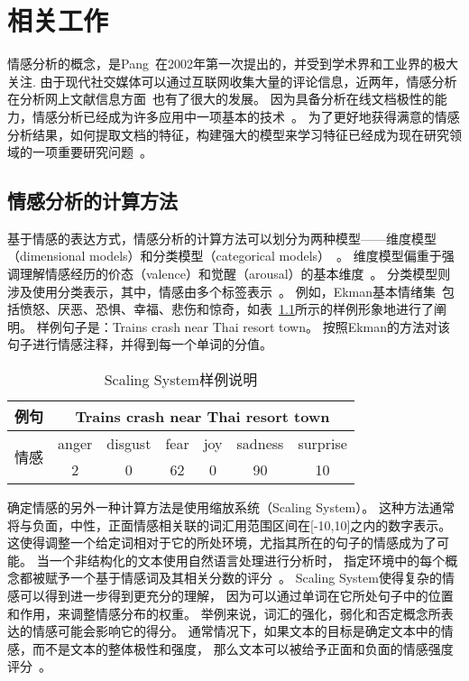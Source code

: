 
\chapter{相关工作}

情感分析的概念，是Pang~在2002年第一次提出的，并受到学术界和工业界的极大关注.
由于现代社交媒体可以通过互联网收集大量的评论信息，近两年，情感分析在分析网上文献信息方面~也有了很大的发展。
因为具备分析在线文档极性的能力，情感分析已经成为许多应用中一项基本的技术~。
为了更好地获得满意的情感分析结果，如何提取文档的特征，构建强大的模型来学习特征已经成为现在研究领域的一项重要研究问题~。

\section{情感分析的计算方法}
基于情感的表达方式，情感分析的计算方法可以划分为两种模型——维度模型（dimensional models）和分类模型（categorical models）~。
维度模型偏重于强调理解情感经历的价态（valence）和觉醒（arousal）的基本维度~。
分类模型则涉及使用分类表示，其中，情感由多个标签表示~。
例如，Ekman基本情绪集~包括愤怒、厌恶、恐惧、幸福、悲伤和惊奇，如表~\ref{scaling}所示的样例形象地进行了阐明。
样例句子是：Trains crash near Thai resort town。
按照Ekman的方法对该句子进行情感注释，并得到每一个单词的分值。

\begin{table}[]
\centering
\caption{Scaling System样例说明}
\label{scaling}
\begin{tabular}{c|c|c|c|c|c|c}
\hline
例句                  & \multicolumn{6}{c}{Trains crash near Thai resort town} \\ \hline
\multirow{2}{*}{情感} & anger  & disgust  & fear  & joy  & sadness  & surprise  \\ \cline{2-7} 
                    & 2      & 0        & 62    & 0    & 90       & 10        \\ \hline
\end{tabular}
\end{table}

确定情感的另外一种计算方法是使用缩放系统（Scaling System）。
这种方法通常将与负面，中性，正面情感相关联的词汇用范围区间在[-10,10]之内的数字表示。
这使得调整一个给定词相对于它的所处环境，尤指其所在的句子的情感成为了可能。
当一个非结构化的文本使用自然语言处理进行分析时，
指定环境中的每个概念都被赋予一个基于情感词及其相关分数的评分~。
Scaling System使得复杂的情感可以得到进一步得到更充分的理解，
因为可以通过单词在它所处句子中的位置和作用，来调整情感分布的权重。
举例来说，词汇的强化，弱化和否定概念所表达的情感可能会影响它的得分。
通常情况下，如果文本的目标是确定文本中的情感，而不是文本的整体极性和强度，
那么文本可以被给予正面和负面的情感强度评分~。

